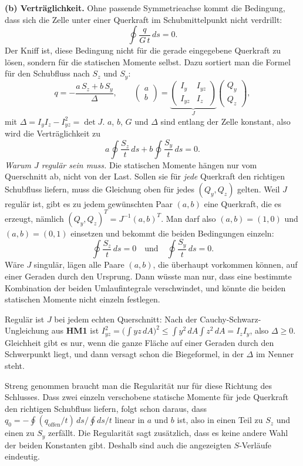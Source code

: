 \textbf{(b) Verträglichkeit.} Ohne passende Symmetrieachse kommt die Bedingung, dass sich die Zelle
unter einer Querkraft im Schubmittelpunkt nicht verdrillt:
\[
  \oint \frac{q}{G\,t}\,ds = 0 .
\]
Der Kniff ist, diese Bedingung nicht für die gerade eingegebene Querkraft zu lösen, sondern für
die statischen Momente selbst. Dazu sortiert man die Formel für den Schubfluss nach $S_z$ und $S_y$:
\[
  q = -\frac{a\,S_z + b\,S_y}{\Delta} , \qquad
  \begin{pmatrix} a \\ b \end{pmatrix}
  = \underbrace{\begin{pmatrix} I_y & I_{yz} \\ I_{yz} & I_z \end{pmatrix}}_{J}
    \begin{pmatrix} Q_y \\ Q_z \end{pmatrix} ,
\]
mit $\Delta = I_y I_z - I_{yz}^2 = \det J$. $a$, $b$, $G$ und $\Delta$ sind entlang der Zelle
konstant, also wird die Verträglichkeit zu
\[
  a \oint \frac{S_z}{t}\,ds + b \oint \frac{S_y}{t}\,ds = 0 .
\]
\emph{Warum $J$ regulär sein muss.} Die statischen Momente hängen nur vom Querschnitt ab, nicht von
der Last. Sollen sie für \emph{jede} Querkraft den richtigen Schubfluss liefern, muss die Gleichung
oben für jedes $(Q_y, Q_z)$ gelten. Weil $J$ regulär ist, gibt es zu jedem gewünschten Paar
$(a, b)$ eine Querkraft, die es erzeugt, nämlich $(Q_y, Q_z)^T = J^{-1}(a, b)^T$. Man darf also
$(a, b) = (1, 0)$ und $(a, b) = (0, 1)$ einsetzen und bekommt die beiden Bedingungen einzeln:
\[
  \oint \frac{S_z}{t}\,ds = 0 \quad\text{und}\quad \oint \frac{S_y}{t}\,ds = 0 .
\]
Wäre $J$ singulär, lägen alle Paare $(a, b)$, die überhaupt vorkommen können, auf einer Geraden durch
den Ursprung. Dann wüsste man nur, dass eine bestimmte Kombination der beiden Umlaufintegrale
verschwindet, und könnte die beiden statischen Momente nicht einzeln festlegen.

Regulär ist $J$ bei jedem echten Querschnitt: Nach der Cauchy-Schwarz-Ungleichung aus \textbf{HM1}
ist $I_{yz}^2 = \bigl(\int y z\,dA\bigr)^2 \le \int y^2\,dA \int z^2\,dA = I_z I_y$, also
$\Delta \ge 0$. Gleichheit gibt es nur, wenn die ganze Fläche auf einer Geraden durch den Schwerpunkt
liegt, und dann versagt schon die Biegeformel, in der $\Delta$ im Nenner steht.

Streng genommen braucht man die Regularität nur für diese Richtung des Schlusses. Dass zwei
einzeln verschobene statische Momente für jede Querkraft den richtigen Schubfluss liefern, folgt
schon daraus, dass $q_0 = -\oint (q_{\text{offen}}/t)\,ds \big/ \oint ds/t$ linear in $a$ und $b$
ist, also in einen Teil zu $S_z$ und einen zu $S_y$ zerfällt. Die Regularität sagt zusätzlich, dass
es keine andere Wahl der beiden Konstanten gibt. Deshalb sind auch die angezeigten $S$-Verläufe
eindeutig.

